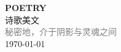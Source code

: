 \vspace*{\fill}
\begin{center}
    \textcolor{purple!50}{\Huge\textbf{POETRY}} \\[1em]
    \textcolor{purple!60!pink}{\Large 诗歌美文} \\[2em]
    \textcolor{gray}{\large 秘密地，介于阴影与灵魂之间} \\[1em]
    \today
\end{center}
\vspace*{\fill}
\clearpage


\clearpage

\clearpage
